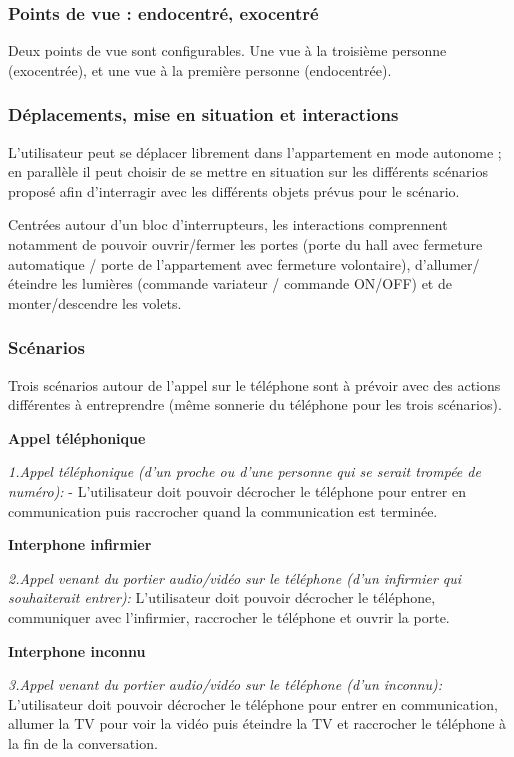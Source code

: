 \subsubsection{Points de vue : endocentré, exocentré}

Deux points de vue sont configurables. Une vue à la troisième personne (exocentrée), et une vue à la première personne (endocentrée).

\subsubsection{Déplacements, mise en situation et interactions}

L'utilisateur peut se déplacer librement dans l'appartement en mode autonome ; en parallèle il peut choisir de se mettre en situation sur les différents scénarios proposé afin d'interragir avec les différents objets prévus pour le scénario. 

Centrées autour d’un bloc d’interrupteurs, les interactions comprennent notamment de pouvoir ouvrir/fermer les portes (porte du hall avec fermeture automatique / porte de l’appartement avec fermeture volontaire), d'allumer/éteindre les lumières (commande variateur / commande ON/OFF) et de monter/descendre les volets.

\subsubsection{Scénarios}
Trois scénarios autour de l'appel sur le téléphone sont à prévoir avec des actions différentes à entreprendre (même sonnerie du téléphone pour les trois scénarios).
\newline 

\textbf{Appel téléphonique}
\newline 

\textit{1.Appel téléphonique (d’un proche ou d’une personne qui se serait trompée de numéro): }\newline 
- L'utilisateur doit pouvoir décrocher le téléphone pour entrer en communication puis raccrocher quand la communication est terminée.
\newline 

\textbf{Interphone infirmier}
\newline 

\textit{2.Appel venant du portier audio/vidéo sur le téléphone (d’un infirmier qui souhaiterait entrer): }\newline 
L'utilisateur doit pouvoir décrocher le téléphone, communiquer avec l'infirmier, raccrocher le téléphone et ouvrir la porte.
\newline 

\textbf{Interphone inconnu}
\newline 

\textit{3.Appel venant du portier audio/vidéo sur le téléphone (d’un inconnu): }\newline 
L'utilisateur doit pouvoir décrocher le téléphone pour entrer en communication, allumer la TV pour voir la vidéo puis éteindre la TV et raccrocher le téléphone à la fin de la conversation.



 
